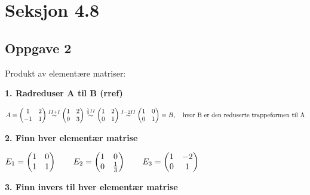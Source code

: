 \documentclass{article}
\newcommand{\vect}[1]{\begin{pmatrix} #1 \end{pmatrix}}
\newcommand{\eqqto}[1]{\overset{\substack{#1}}{\sim}}
\begin{document}
\newpage
\section*{Seksjon 4.8}
\subsection*{Oppgave 2}
Produkt av elementære matriser:

\textbf{1. Radreduser A til B (rref)}

\(A=
\begin{pmatrix}
1&2\\
-1&1
\end{pmatrix}
\eqqto{II+I}
\begin{pmatrix}
1&2\\
0&3
\end{pmatrix}
\eqqto{\frac{1}{3}II}
\begin{pmatrix}
1&2\\
0&1
\end{pmatrix}
\eqqto{I-2II}
\begin{pmatrix}
1&0\\
0&1
\end{pmatrix} = B, \quad \text{hvor B er den reduserte trappeformen til A}
\\\\\)

\textbf{2. Finn hver elementær matrise}

\(
E_1 = \vect{1&0\\1&1} \qquad
E_2 = \vect{1&0\\0&\frac{1}{3}} \qquad
E_3 = \vect{1&-2\\0&1}\\\\\)

\textbf{3. Finn invers til hver elementær matrise}
\end{document}
